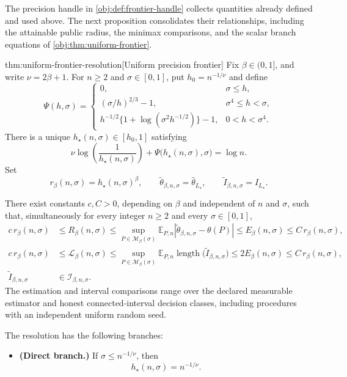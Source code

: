 The precision handle in \cref{obj:def:frontier-handle} collects quantities already defined and used above. The next proposition consolidates their relationships, including the attainable public radius, the minimax comparisons, and the scalar branch equations of \cref{obj:thm:uniform-frontier}.

\begin{propositionv}{thm:uniform-frontier-resolution}[Uniform precision frontier]
Fix \(\beta\in(0,1]\), and write \(\nu=2\beta+1\). For \(n\ge2\) and \(\sigma\in[0,1]\), put \(h_0=n^{-1/\nu}\) and define
\[
\Psi(h,\sigma)=
\begin{cases}
0, & \sigma\le h,\\
(\sigma/h)^{2/3}-1, & \sigma^4\le h<\sigma,\\
h^{-1/2}\bigl\{1+\log(\sigma^2h^{-1/2})\bigr\}-1,
    & 0<h<\sigma^4.
\end{cases}
\]
There is a unique \(h_\star(n,\sigma)\in[h_0,1]\) satisfying
\[
\nu\log\!\left(\frac1{h_\star(n,\sigma)}\right)
+\Psi\bigl(h_\star(n,\sigma),\sigma\bigr)=\log n.
\]
Set
\[
r_\beta(n,\sigma)=h_\star(n,\sigma)^\beta,\qquad
\widetilde\theta_{\beta,n,\sigma}=\widehat\theta_{L_\star},
\qquad
\widetilde I_{\beta,n,\sigma}=I_{L_\star}.
\]

There exist constants \(c,C>0\), depending on \(\beta\) and independent of \(n\) and \(\sigma\), such that, simultaneously for every integer \(n\ge2\) and every \(\sigma\in[0,1]\),
\[
\begin{aligned}
c\,r_\beta(n,\sigma)
&\le R_\beta(n,\sigma)
\le \sup_{P\in\mathcal M_\beta(\sigma)}
   \mathbb E_{P,n}
   \left|\widetilde\theta_{\beta,n,\sigma}-\theta(P)\right|
\le E_\beta(n,\sigma)
\le C\,r_\beta(n,\sigma),\\
c\,r_\beta(n,\sigma)
&\le \mathcal L_\beta(n,\sigma)
\le \sup_{P\in\mathcal M_\beta(\sigma)}
   \mathbb E_{P,n}
   \operatorname{length}\bigl(\widetilde I_{\beta,n,\sigma}\bigr)
\le 2E_\beta(n,\sigma)
\le C\,r_\beta(n,\sigma),\\
\widetilde I_{\beta,n,\sigma}
&\in\mathcal I_{\beta,n,\sigma}.
\end{aligned}
\]
The estimation and interval comparisons range over the declared measurable estimator and honest connected-interval decision classes, including procedures with an independent uniform random seed.

The resolution has the following branches:
\begin{itemize}
\item \textbf{(Direct branch.)}
If \(\sigma\le n^{-1/\nu}\), then
\[
h_\star(n,\sigma)=n^{-1/\nu}.
\]


\end{itemize}
\end{propositionv}

